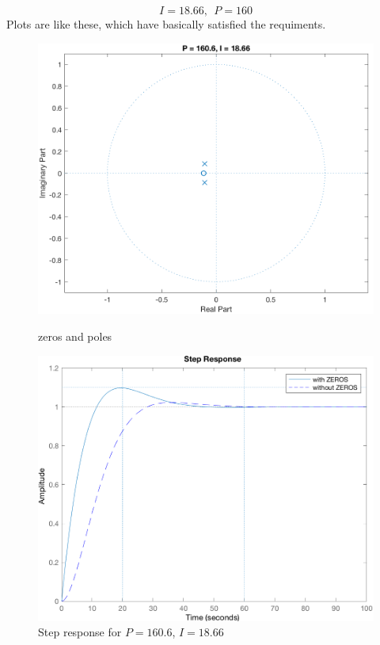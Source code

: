 \documentclass[a4paper]{article}
\begin{document}
$$
I = 18.66,\ \ P = 160
$$
Plots are like these, which have basically satisfied the requiments.
\begin{figure}[H]
\centering
\begin{minipage}[t]{0.48\textwidth}
\centering
\includegraphics[width=\textwidth]{pic/zp2.png}
\caption{zeros and poles}
\end{minipage}
\begin{minipage}[t]{0.48\textwidth}
\centering
\includegraphics[width=\textwidth]{pic/zo2.png}
\caption{Step response for $P = 160.6$, $I = 18.66$}
\end{minipage}
\end{figure}
\end{document}

